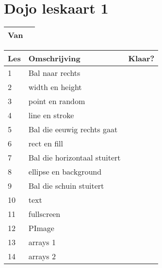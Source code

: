 \documentclass{article}
\begin{document}
\section*{
  \Huge
  Dojo leskaart 1
}

\begin{table}[!htbp]
  \Huge
  \centering 
  \begin{tabularx}{\textwidth}{ | l | p{9.85cm} | }
    \hline
    Van &  \\
    \hline
  \end{tabularx}
\end{table}


\begin{table}[!htbp]
  \LARGE
  \centering 
  \begin{tabularx}{\textwidth}{ | l | l | l | }
    \hline
    Les & Omschrijving & Klaar? \\
    \hline
    \hline
    1 & Bal naar rechts & \\
    2 & width en height & \\
    3 & point en random & \\
    4 & line en stroke & \\
    5 & Bal die eeuwig rechts gaat & \\
    6 & rect en fill & \\
    7 & Bal die horizontaal stuitert & \\
    8 & ellipse en background & \\
    9 & Bal die schuin stuitert & \\
    10 & text & \\
    11 & fullscreen & \\
    12 & PImage & \\
    13 & arrays 1 & \\
    14 & arrays 2 & \\
    \hline
  \end{tabularx}
\end{table}
\end{document}
